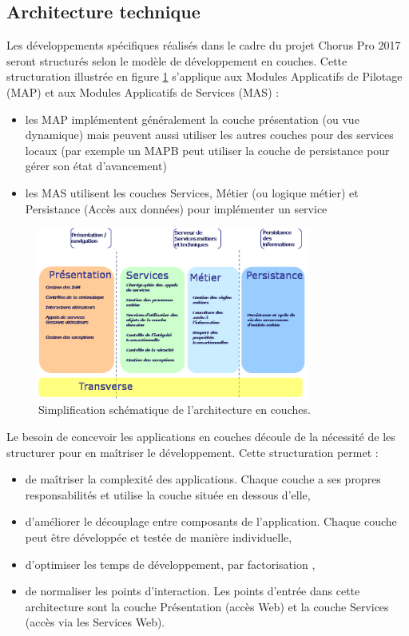 \documentclass[12pt,a4paper]{article}
\begin{document}
\subsection{Architecture technique}
Les développements spécifiques réalisés dans le cadre du projet Chorus Pro 2017 seront structurés selon le modèle de développement en couches. 
Cette structuration illustrée en figure \ref{couches} s’applique aux Modules Applicatifs de Pilotage (MAP) et aux Modules Applicatifs de Services (MAS) :
\smallbreak
\begin{itemize}
\item	les MAP implémentent généralement la couche présentation (ou vue dynamique) mais peuvent aussi utiliser les autres couches pour des services locaux (par exemple un MAPB peut utiliser la couche de persistance pour gérer son état d'avancement)
\item	les MAS utilisent les couches Services, Métier (ou logique métier) et Persistance (Accès aux données) pour implémenter un service
\end{itemize}
\bigbreak
\begin{figure}[H]
	\begin{center}
		\includegraphics[width=0.8\textwidth,keepaspectratio]{couchesModules.png}
		\caption{Simplification schématique de l'architecture en couches.}
		\label{couches}
	\end{center}
\end{figure}
\clearpage
\newpage
Le besoin de concevoir les applications en couches découle de la nécessité de les structurer pour en maîtriser le développement. Cette structuration permet :
\smallbreak
\begin{itemize}
\item	de maîtriser la complexité des applications. Chaque couche a ses propres responsabilités et utilise la couche située en dessous d’elle,
\item	d’améliorer le découplage entre composants de l’application. Chaque couche peut être développée et testée de manière individuelle,
\item	d’optimiser les temps de développement, par factorisation ,
\item	de normaliser les points d’interaction. Les points d’entrée dans cette architecture sont la couche Présentation (accès Web) et la couche Services (accès via les Services Web).
\end{itemize}
\end{document}
